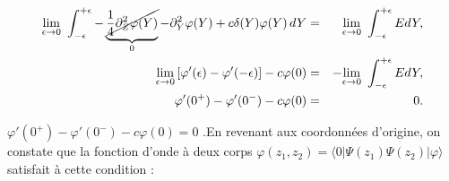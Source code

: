 {\color{gray} 
\begin{eqnarray*}
	\underset{ \epsilon \to 0 }{\lim} \int_{-\epsilon}^{+\epsilon}  	-\underbrace{\cancel{\frac{1}{4} \partial_Z^2\varphi(Y)}}_{0} - 	\partial_Y^2\varphi(Y) + c \delta ( Y )\varphi(Y) \, dY  & = & \underset{ \epsilon \to 0 }{\lim}  \int_{-\epsilon}^{+\epsilon}  E d Y , \\
	\underset{ \epsilon \to 0 }{\lim}  \left [ \varphi'(\epsilon) - \varphi'(-\epsilon) \right ] - c \varphi (  0 ) & =  &  -\underset{ \epsilon \to 0 }{\lim}  \int_{-\epsilon}^{+\epsilon}  E d Y,\\
	 \varphi'(0^+) - \varphi'(0^-) - c \varphi (  0 ) & = & 0 .
\end{eqnarray*}


}


$\varphi'(0^+) - \varphi'(0^-) - c \varphi (  0 )  =  0 $ .En revenant aux coordonnées d'origine, on constate que la fonction d'onde à deux corps $\varphi (z_1, z_2) = \langle 0 \vert \Psi (z_1)\Psi (z_2) \vert \varphi \rangle$ satisfait à cette condition :\\


